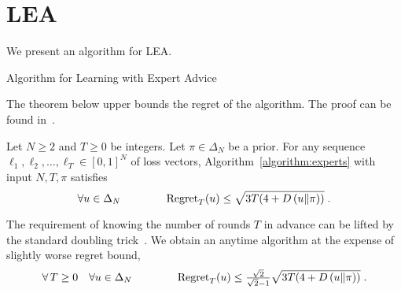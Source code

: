 \section{\acl{LEA}}
\label{section:experts}

We present an algorithm for \ac{LEA}.

\begin{algorithm}[h]
\begin{algorithmic}
\caption{Algorithm for Learning with Expert Advice \label{algorithm:experts}}
{
\ENDFOR
}
\end{algorithmic}
\end{algorithm}


The theorem below upper bounds the regret of the algorithm.
The proof can be found in~\cite{Orabona-Pal-2016-parameter-free}.

\begin{theorem}
\label{theorem:experts-regret}
Let $N \ge 2$ and $T \ge 0$ be integers. Let $\pi \in \Delta_N$ be a prior.
For any sequence $\ell_1, \ell_2, \dots, \ell_T \in
[0,1]^N$ of loss vectors, Algorithm~\ref{algorithm:experts}
with input $N,T,\pi$ satisfies
$$
\forall u \in \Delta_N \qquad \qquad \operatorname{Regret}_T(u) \le \sqrt{3T (4 + D\left({u}\middle\|{\pi}\right))} \; .
$$
\end{theorem}

The requirement of knowing the number of rounds $T$ in advance can be lifted by
the standard doubling trick~\citep[Section 2.3.1]{Shalev-Shwartz-2011}. We obtain
an anytime algorithm at the expense of slightly worse regret bound,
$$
\forall \, T \ge 0 \quad \forall u \in \Delta_N \qquad \qquad
\operatorname{Regret}_T(u) \le \tfrac{\sqrt{2}}{\sqrt{2} - 1} \sqrt{3T (4 + D\left({u}\middle\|{\pi}\right))} \; .
$$


